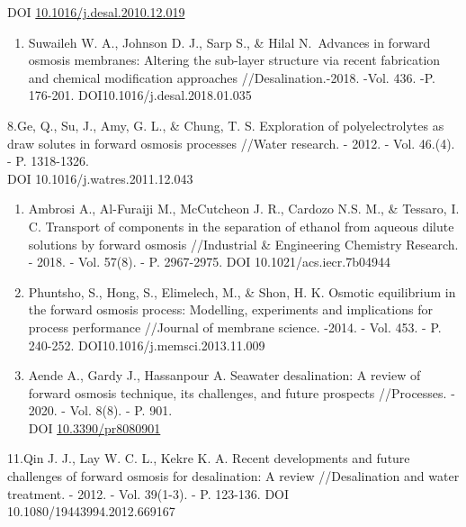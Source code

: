 \begin{references}
DOI
\href{http://dx.doi.org/10.1016/j.desal.2010.12.019}{10.1016/j.desal.2010.12.019}

\begin{enumerate}
\def\labelenumi{\arabic{enumi}.}
\setcounter{enumi}{6}
\item
  Suwaileh W. A., Johnson D. J., Sarp S., \& Hilal N.~Advances in
  forward osmosis membranes: Altering the sub-layer structure via recent
  fabrication and chemical modification approaches //Desalination.-2018.
  -Vol. 436. -P. 176-201. DOI10.1016/j.desal.2018.01.035
\end{enumerate}

8.Ge, Q., Su, J., Amy, G. L., \& Chung, T. S. Exploration of
polyelectrolytes as draw solutes in forward osmosis processes //Water
research. - 2012. - Vol. 46.(4). - P. 1318-1326.\\
DOI 10.1016/j.watres.2011.12.043

\begin{enumerate}
\def\labelenumi{\arabic{enumi}.}
\setcounter{enumi}{7}
\item
  Ambrosi A., Al-Furaiji M., McCutcheon J. R., Cardozo N.S. M., \&
  Tessaro, I. C. Transport of components in the separation of ethanol
  from aqueous dilute solutions by forward osmosis //Industrial \&
  Engineering Chemistry Research. - 2018. - Vol. 57(8). - P. 2967-2975.
  DOI 10.1021/acs.iecr.7b04944
\item
  Phuntsho, S., Hong, S., Elimelech, M., \& Shon, H. K. Osmotic
  equilibrium in the forward osmosis process: Modelling, experiments and
  implications for process performance //Journal of membrane science.
  -2014. - Vol. 453. - P. 240-252. DOI10.1016/j.memsci.2013.11.009
\item
  Aende A., Gardy J., Hassanpour A. Seawater desalination: A review of
  forward osmosis technique, its challenges, and future prospects
  //Processes. - 2020. - Vol. 8(8). - P. 901.\\
  DOI \href{http://dx.doi.org/10.3390/pr8080901}{10.3390/pr8080901}
\end{enumerate}

11.Qin J. J., Lay W. C. L., Kekre K. A. Recent developments and future
challenges of forward osmosis for desalination: A review //Desalination
and water treatment. - 2012. - Vol. 39(1-3). - P. 123-136. DOI
10.1080/19443994.2012.669167


\end{references}
